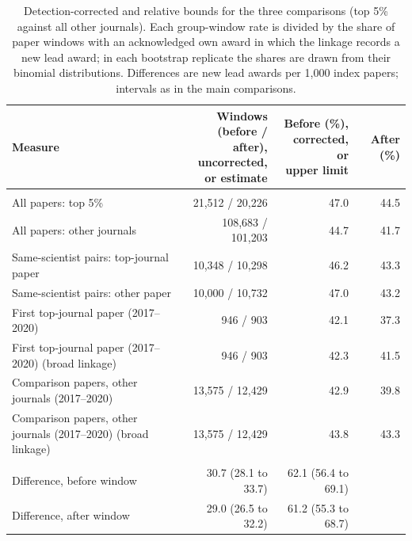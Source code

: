 \begin{table}[H]
\centering\small
\caption{Detection-corrected and relative bounds for the three comparisons (top 5\% against all other journals). Each group-window rate is divided by the share of paper windows with an acknowledged own award in which the linkage records a new lead award; in each bootstrap replicate the shares are drawn from their binomial distributions. Differences are new lead awards per 1,000 index papers; intervals as in the main comparisons.}\label{tab:s_bounds}
\footnotesize
\begin{tabularx}{\linewidth}{>{\raggedright\arraybackslash}Xrrr}
\toprule
Measure & \makecell[rb]{Windows\\(before /\\after),\\uncorrected,\\or estimate} & \makecell[rb]{Before (\%),\\corrected, or\\upper limit} & After (\%) \\
\midrule
\multicolumn{4}{>{\raggedright\arraybackslash}p{\dimexpr\textwidth-2\tabcolsep\relax}}{\textit{Detection: windows with an acknowledged own award, and the share in which the linkage records a new lead award (\%)}} \\
All papers: top 5\% & 21,512 / 20,226 & 47.0 & 44.5 \\
All papers: other journals & 108,683 / 101,203 & 44.7 & 41.7 \\
Same-scientist pairs: top-journal paper & 10,348 / 10,298 & 46.2 & 43.3 \\
Same-scientist pairs: other paper & 10,000 / 10,732 & 47.0 & 43.2 \\
First top-journal paper (2017--2020) & 946 / 903 & 42.1 & 37.3 \\
First top-journal paper (2017--2020) (broad linkage) & 946 / 903 & 42.3 & 41.5 \\
Comparison papers, other journals (2017--2020) & 13,575 / 12,429 & 42.9 & 39.8 \\
Comparison papers, other journals (2017--2020) (broad linkage) & 13,575 / 12,429 & 43.8 & 43.3 \\
\multicolumn{4}{>{\raggedright\arraybackslash}p{\dimexpr\textwidth-2\tabcolsep\relax}}{\textit{Between scientists: uncorrected and detection-corrected}} \\
Difference, before window & 30.7 (28.1 to 33.7) & 62.1 (56.4 to 69.1) &  \\
Difference, after window & 29.0 (26.5 to 32.2) & 61.2 (55.3 to 68.7) &  \\

\end{tabularx}
\end{table}
